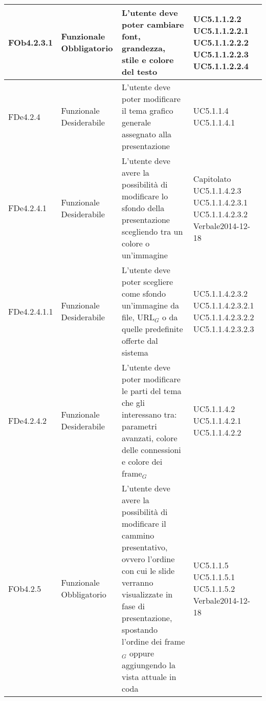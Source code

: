 \begin{longtable}{|l|p{2.5cm}|p{5cm}|p{3.5cm}|}
\hline
FOb4.2.3.1 & Funzionale \linebreak Obbligatorio & L'utente deve poter cambiare font, grandezza, stile e colore del testo  & UC5.1.1.2.2 \linebreak  UC5.1.1.2.2.1 \linebreak  UC5.1.1.2.2.2 \linebreak  UC5.1.1.2.2.3 \linebreak  UC5.1.1.2.2.4 \linebreak  \\
\hline
FDe4.2.4 & Funzionale \linebreak Desiderabile & L'utente deve poter modificare il tema grafico generale assegnato alla presentazione & UC5.1.1.4 \linebreak  UC5.1.1.4.1 \linebreak  \\
\hline
FDe4.2.4.1 & Funzionale \linebreak Desiderabile & L'utente deve avere la possibilità di modificare lo sfondo della presentazione scegliendo tra un colore o un'immagine & Capitolato \linebreak  UC5.1.1.4.2.3 \linebreak  UC5.1.1.4.2.3.1 \linebreak  UC5.1.1.4.2.3.2 \linebreak  Verbale2014-12-18 \linebreak  \\
\hline
FDe4.2.4.1.1 & Funzionale \linebreak Desiderabile & L'utente deve poter scegliere come sfondo un'immagine da file, URL$_G$ o da quelle predefinite offerte dal sistema & UC5.1.1.4.2.3.2 \linebreak  UC5.1.1.4.2.3.2.1 \linebreak  UC5.1.1.4.2.3.2.2 \linebreak  UC5.1.1.4.2.3.2.3 \linebreak  \\
\hline
FDe4.2.4.2 & Funzionale \linebreak Desiderabile & L'utente deve poter modificare le parti del tema che gli interessano tra: parametri avanzati, colore delle connessioni e colore dei frame$_G$ & UC5.1.1.4.2 \linebreak  UC5.1.1.4.2.1 \linebreak  UC5.1.1.4.2.2 \linebreak  \\
\hline
FOb4.2.5 & Funzionale \linebreak Obbligatorio & L'utente deve avere la possibilità di modificare il cammino presentativo, ovvero l'ordine con cui le slide verranno visualizzate in fase di presentazione, spostando l'ordine dei frame$_G$ oppure aggiungendo la vista attuale in coda & UC5.1.1.5 \linebreak  UC5.1.1.5.1 \linebreak  UC5.1.1.5.2 \linebreak  Verbale2014-12-18 \linebreak  \\

\end{longtable}
